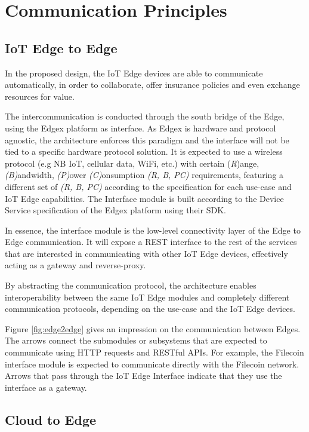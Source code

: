 \section{Communication Principles}
\subsection{IoT Edge to Edge}

In the proposed design, the IoT Edge devices are able to communicate automatically, in order to collaborate, offer insurance policies and even exchange resources for value.
 
The intercommunication is conducted through the south bridge of the Edge, using the Edgex platform as interface. As Edgex is hardware and protocol agnostic, the architecture enforces this paradigm and the interface will not be tied to a specific hardware protocol solution. It is expected to use a wireless protocol (e.g NB IoT, cellular data, WiFi, etc.) with certain (\textit{R})ange, \textit{(B)}andwidth, \textit{(P)}ower \textit{(C)}onsumption \textit{(R, B, PC)} requirements, featuring a different set of \textit{(R, B, PC)} according to the specification for each use-case and IoT Edge capabilities. The Interface module is built according to the Device Service specification of the Edgex platform using their SDK.
 
In essence, the interface module is the low-level connectivity layer of the Edge to Edge communication. It will expose a REST interface to the rest of the services that are interested in communicating with other IoT Edge devices, effectively acting as a gateway and reverse-proxy.

By abstracting the communication protocol, the architecture enables interoperability between the same IoT Edge modules and completely different communication protocols, depending on the use-case and the IoT Edge devices.

Figure \ref{fig:edge2edge} gives an impression on the communication between Edges. The arrows connect the submodules or subsystems that are expected to communicate using HTTP requests and RESTful APIs. For example, the Filecoin interface module is expected to communicate directly with the Filecoin network. Arrows that pass through the IoT Edge Interface indicate that they use the interface as a gateway.
\subsection{Cloud to Edge}

